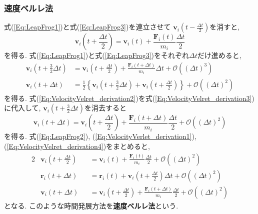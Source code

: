 \subsubsection{速度ベルレ法}
式(\ref{Eq:LeapFrog1})と式(\ref{Eq:LeapFrog3})を連立させて
$\bm{v}_{i}(t - \frac{\Delta t}{2})$を消すと,
\begin{equation}
 \bm{v}_{i} \left( t + \frac{\Delta t}{2} \right)
  = \bm{v}_{i} (t)
  + \frac{ \bm{F}_{i}(t) }{m_{i}} \frac{\Delta t}{2}
 \label{Eq:VelocityVerlet_derivation1}
\end{equation}
を得る. 
式(\ref{Eq:LeapFrog1})と式(\ref{Eq:LeapFrog3})をそれぞれ$\Delta t$だけ進めると,
\begin{align}
 \bm{v}_{i} \left( t + \frac{3}{2}\Delta t \right)
 &= \bm{v}_{i} \left( t + \frac{\Delta t}{2} \right)
  + \frac{\bm{F}_{i} (t + \Delta t)}{m_{i}}\Delta t 
  + \mathcal{O}((\Delta t)^{3})
 \label{Eq:VelocityVelret_derivation2}
 \\
 \bm{v}_{i} (t + \Delta t)
 &= \frac{1}{2}
    \left\{
             \bm{v}_{i} \left( t + \frac{3}{2}\Delta t \right)
           + \bm{v}_{i} \left( t + \frac{\Delta t}{2}  \right)
    \right\}
  + \mathcal{O}((\Delta t)^2)
 \label{Eq:VelocityVelret_derivation3}
\end{align}
を得る. 
式(\ref{Eq:VelocityVelret_derivation2})を式(\ref{Eq:VelocityVelret_derivation3})
に代入して, $\bm{v}_{i}(t + \frac{3}{2}\Delta t)$を消去すると
\begin{equation}
 \bm{v}_{i} (t + \Delta t)
  = \bm{v}_{i} \left( t + \frac{\Delta t}{2} \right)
  + \frac{\bm{F}_{i} (t + \Delta t)}{m_{i}} \frac{\Delta t}{2}
  + \mathcal{O}((\Delta t)^{2})
 \label{Eq:VelocityVelret_derivation4}
\end{equation}
を得る. 
式(\ref{Eq:LeapFrog2}), (\ref{Eq:VelocityVerlet_derivation1}), 
(\ref{Eq:VelocityVelret_derivation4})をまとめると,
\begin{alignat}{2}
 &\bm{v}_{i} \left( t + \frac{\Delta t}{2} \right)
 &&= \bm{v}_{i} (t)
  + \frac{\bm{F}_{i} (t) }{m_{i}} \frac{\Delta t}{2}
  + \mathcal{O}((\Delta t)^{2})
 \label{eq:1.21}
 \\
 &\bm{r}_{i} (t + \Delta t)
 &&= \bm{r}_{i} (t)
  + \bm{v}_{i} \left( t + \frac{\Delta t}{2} \right)\Delta t
  + \mathcal{O} ((\Delta t)^{2})
 \label{eq:1.22}
 \\
 &\bm{v}_{i} \left( t + \Delta t \right)
 &&= \bm{v}_{i} \left(t + \frac{\Delta t}{2} \right)
  + \frac{\bm{F}_{i} (t + \Delta t) }{m_{i}} \frac{\Delta t}{2}
  + \mathcal{O}((\Delta t)^{2})
 \label{eq:1.23}
\end{alignat}
となる. このような時間発展方法を{\bf{速度ベルレ法}}という. 

